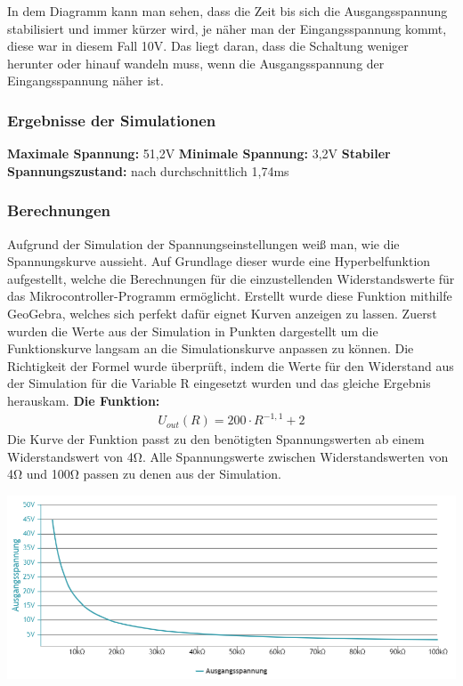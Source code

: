 \documentclass[paper=a4, 12pt]{scrreprt}
\begin{document}
			In dem Diagramm kann man sehen, dass die Zeit bis sich die Ausgangsspannung stabilisiert und immer kürzer wird, je näher man der Eingangsspannung kommt, diese war in diesem Fall 10V. Das liegt daran, dass die Schaltung weniger herunter oder hinauf wandeln muss, wenn die Ausgangsspannung der Eingangsspannung näher ist.
		
			\subsubsection{Ergebnisse der Simulationen}\hfill \break
			{\large \textbf{Maximale Spannung:} 51,2V} \hfill \break
			{\large \textbf{Minimale Spannung:} 3,2V}\hfill \break
			{\large \textbf{Stabiler Spannungszustand:} nach durchschnittlich 1,74ms} \hfill \break
			
			\subsubsection{Berechnungen}\hfill \break
			\label{sec:berechnungen}
			Aufgrund der Simulation der Spannungseinstellungen weiß man, wie die Spannungskurve aussieht. Auf Grundlage dieser wurde eine Hyperbelfunktion aufgestellt, welche die Berechnungen für die einzustellenden Widerstandswerte für das Mikrocontroller-Programm ermöglicht. \hfill \break
			Erstellt wurde diese Funktion mithilfe GeoGebra, welches sich perfekt dafür eignet Kurven anzeigen zu lassen. Zuerst wurden die Werte aus der Simulation in Punkten dargestellt um die Funktionskurve langsam an die Simulationskurve anpassen zu können. \hfill \break
			Die Richtigkeit der Formel wurde überprüft, indem die Werte für den Widerstand aus der Simulation für die Variable R eingesetzt wurden und das gleiche Ergebnis herauskam. \hfill \break \hfill \break
			\textbf{Die Funktion:} 
			\begin{align*} 
			U_{out}(R) = 200 \cdot R^{-1,1} + 2
			\end{align*}
			Die Kurve der Funktion passt zu den benötigten Spannungswerten ab einem Widerstandswert von 4Ω. Alle Spannungswerte zwischen Widerstandswerten von 4Ω und 100Ω passen zu denen aus der Simulation.
			\begin{adjustbox}{center,caption={Berechneter Spannungsverlauf bei Widerstandsänderung},label={fig:berechnungSPG},nofloat=figure,vspace=\bigskipamount}
				\includegraphics[width=\textwidth]{img/berechnungSPG.PNG}
			\end{adjustbox}
\end{document}
